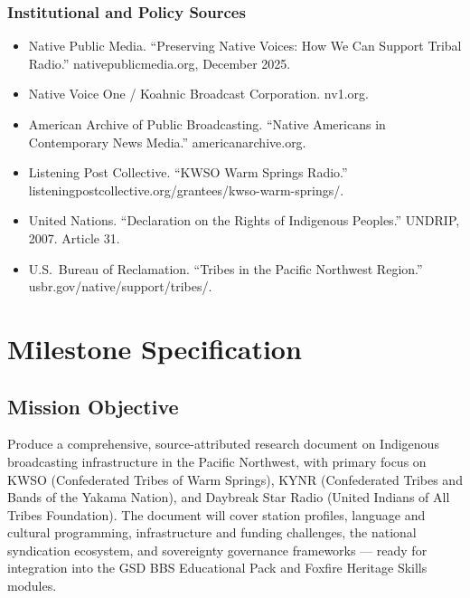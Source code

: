 \documentclass[11pt,letterpaper]{article}
\newcommand{\stageheader}[2]{%
  \noindent\colorbox{#2}{\makebox[\textwidth][l]{%
    \textcolor{white}{\bfseries\sffamily\hspace{6pt}#1\hspace{6pt}}}}%
  \vspace{0.5em}\par%
}
\begin{document}
\subsubsection{Institutional and Policy Sources}
\begin{itemize}[leftmargin=2em]
  \item Native Public Media. ``Preserving Native Voices: How We Can Support Tribal Radio.'' nativepublicmedia.org, December 2025.
  \item Native Voice One / Koahnic Broadcast Corporation. nv1.org.
  \item American Archive of Public Broadcasting. ``Native Americans in Contemporary News Media.'' americanarchive.org.
  \item Listening Post Collective. ``KWSO Warm Springs Radio.'' listeningpostcollective.org/grantees/kwso-warm-springs/.
  \item United Nations. ``Declaration on the Rights of Indigenous Peoples.'' UNDRIP, 2007. Article 31.
  \item U.S.\ Bureau of Reclamation. ``Tribes in the Pacific Northwest Region.'' usbr.gov/native/support/tribes/.
\end{itemize}

\newpage

\stageheader{STAGE 3 --- MISSION PACKAGE}{tertiary}

\section{Milestone Specification}

\subsection{Mission Objective}

Produce a comprehensive, source-attributed research document on Indigenous broadcasting infrastructure in the Pacific Northwest, with primary focus on KWSO (Confederated Tribes of Warm Springs), KYNR (Confederated Tribes and Bands of the Yakama Nation), and Daybreak Star Radio (United Indians of All Tribes Foundation). The document will cover station profiles, language and cultural programming, infrastructure and funding challenges, the national syndication ecosystem, and sovereignty governance frameworks --- ready for integration into the GSD BBS Educational Pack and Foxfire Heritage Skills modules.
\end{document}
